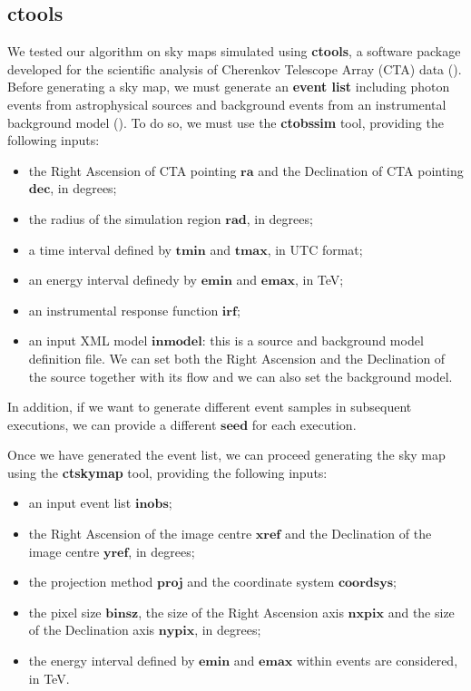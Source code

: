 \documentclass[a4paper,12pt,oneside]{book}
\begin{document}
\begin{onehalfspace}
	\section{ctools}
	We tested our algorithm on sky maps simulated using \textbf{ctools}, a software package developed for the scientific analysis of Cherenkov Telescope Array (CTA) data (\cite{tre_zero}). \\
	Before generating a sky map, we must generate an \textbf{event list} including photon events from astrophysical sources and background events from an instrumental background model (\cite{tre_uno}). To do so, we must use the \textbf{ctobssim} tool, providing the following inputs: 
	\begin{itemize}
	    \setlength\itemsep{0em}
	    \item the Right Ascension of CTA pointing $\bm{ra}$ and the Declination of CTA pointing $\bm{dec}$, in degrees;
	    \item the radius of the simulation region $\bm{rad}$, in degrees;
	    \item a time interval defined by $\bm{tmin}$ and $\bm{tmax}$, in UTC format;
	    \item an energy interval definedy by $\bm{emin}$ and $\bm{emax}$, in TeV;
	    \item an instrumental response function $\bm{irf}$;
	    \item an input XML model $\bm{inmodel}$: this is a source and background model definition file. We can set both the Right Ascension and the Declination of the source together with its flow and we can also set the background model.
	\end{itemize}
	In addition, if we want to generate different event samples in subsequent executions, we can provide a different $\bm{seed}$ for each execution.
	
	Once we have generated the event list, we can proceed generating the sky map using the \textbf{ctskymap} tool, providing the following inputs:
	\begin{itemize}
	    \setlength\itemsep{0em}
	    \item an input event list $\bm{inobs}$;
	    \item the Right Ascension of the image centre $\bm{xref}$ and the Declination of the image centre $\bm{yref}$, in degrees;
	    \item the projection method $\bm{proj}$ and the coordinate system $\bm{coordsys}$;
	    \item the pixel size $\bm{binsz}$, the size of the Right Ascension axis $\bm{nxpix}$ and the size of the Declination axis $\bm{nypix}$, in degrees;
	    \item the energy interval defined by $\bm{emin}$ and $\bm{emax}$ within events are considered, in TeV.
	 \end{itemize}
	

\end{onehalfspace}
\end{document}

